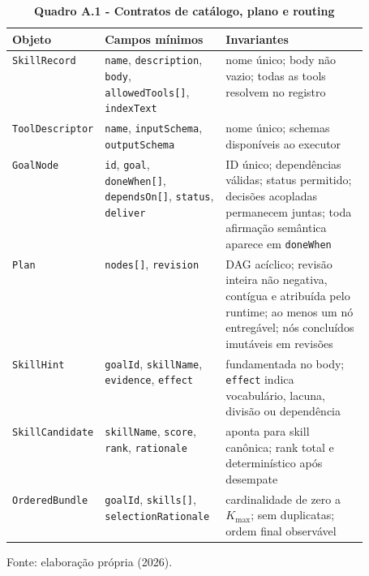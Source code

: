 \begin{table}[H]
\centering
\caption*{\textbf{Quadro A.1 - Contratos de catálogo, plano e routing}}
\scriptsize
\renewcommand{\arraystretch}{1.1}
\begin{tabularx}{\linewidth}{|>{\raggedright\arraybackslash}p{0.17\linewidth}|>{\raggedright\arraybackslash}p{0.34\linewidth}|Y|}
\hline
\textbf{Objeto} & \textbf{Campos mínimos} & \textbf{Invariantes} \\
\hline
\texttt{SkillRecord} &
\texttt{name}, \texttt{description}, \texttt{body},
\texttt{allowedTools[]}, \texttt{indexText} &
nome único; body não vazio; todas as tools resolvem no registro \\
\hline
\texttt{ToolDescriptor} &
\texttt{name}, \texttt{inputSchema}, \texttt{outputSchema} &
nome único; schemas disponíveis ao executor \\
\hline
\texttt{GoalNode} &
\texttt{id}, \texttt{goal}, \texttt{doneWhen[]}, \texttt{dependsOn[]},
\texttt{status}, \texttt{deliver} &
ID único; dependências válidas; status permitido; decisões acopladas permanecem juntas;
toda afirmação semântica aparece em \texttt{doneWhen} \\
\hline
\texttt{Plan} & \texttt{nodes[]}, \texttt{revision} &
DAG acíclico; revisão inteira não negativa, contígua e atribuída pelo runtime;
ao menos um nó entregável; nós concluídos imutáveis em revisões \\
\hline
\texttt{SkillHint} &
\texttt{goalId}, \texttt{skillName}, \texttt{evidence}, \texttt{effect} &
fundamentada no body; \texttt{effect} indica vocabulário, lacuna, divisão ou dependência \\
\hline
\texttt{SkillCandidate} &
\texttt{skillName}, \texttt{score}, \texttt{rank}, \texttt{rationale} &
aponta para skill canônica; rank total e determinístico após desempate \\
\hline
\texttt{OrderedBundle} &
\texttt{goalId}, \texttt{skills[]}, \texttt{selectionRationale} &
cardinalidade de zero a $K_{\max}$; sem duplicatas; ordem final observável \\
\hline
\end{tabularx}
\par\smallskip\raggedright\small Fonte: elaboração própria (2026).
\end{table}
